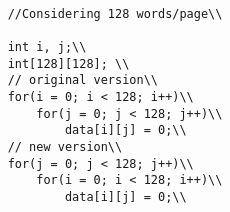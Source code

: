 

\begin{lstlisting}

    //Considering 128 words/page\\
    
    int i, j;\\
    int[128][128]; \\
    // original version\\
    for(i = 0; i < 128; i++)\\
        for(j = 0; j < 128; j++)\\
            data[i][j] = 0;\\
    // new version\\
    for(j = 0; j < 128; j++)\\
        for(i = 0; i < 128; i++)\\
            data[i][j] = 0;\\

\end{lstlisting}
% 
 
